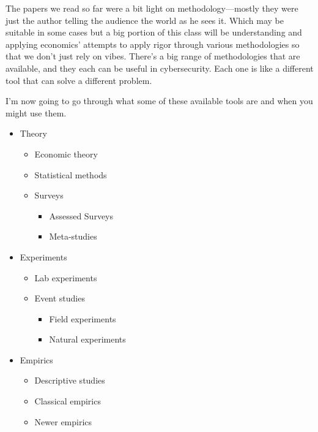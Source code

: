 \documentclass[11pt]{article}
\begin{document}
The papers we read so far were a bit light on methodology---mostly they were just the author telling the audience the world as he sees it. Which may be suitable in some cases but a big portion of this class will be understanding and applying economics' attempts to apply rigor through various methodologies so that we don't just rely on vibes. 
There's a big range of methodologies that are available, and they each can be useful in cybersecurity. 
Each one is like a different tool that can solve a different problem.

I'm now going to go through what some of these available tools are and when you might use them.

\begin{itemize}
    \item Theory
        \begin{itemize}
            \item Economic theory
            \item Statistical methods
            \item Surveys
                \begin{itemize}
                    \item Assessed Surveys
                    \item Meta-studies
                \end{itemize}
        \end{itemize}
    \item Experiments
        \begin{itemize}
            \item Lab experiments
            \item Event studies
                \begin{itemize}
                    \item Field experiments
                    \item Natural experiments
                \end{itemize}
        \end{itemize}
    \item Empirics
        \begin{itemize}
            \item Descriptive studies
            \item Classical empirics
            \item Newer empirics
        \end{itemize}
\end{itemize}
\end{document}
